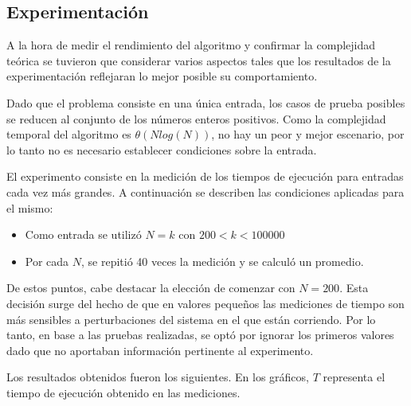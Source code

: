     \subsection{Experimentación}

	A la hora de medir el rendimiento del algoritmo y confirmar la complejidad
	teórica se tuvieron que considerar varios aspectos tales que los
	resultados de la experimentación reflejaran lo mejor posible su
	comportamiento.

	Dado que el problema consiste en una única entrada, los casos de prueba
	posibles se reducen al conjunto de los números enteros positivos. Como la
	complejidad temporal del algoritmo es $\theta(Nlog(N))$, no hay un peor
	y mejor escenario, por lo tanto no es necesario establecer condiciones sobre
	la entrada.

	El experimento consiste en la medición de los tiempos de ejecución para
	entradas cada vez más grandes. A continuación se describen las condiciones aplicadas
	para el mismo:

	\begin{itemize}
		\item{Como entrada se utilizó $N = k$ con $200 < k < 100000$}
		\item{Por cada $N$, se repitió 40 veces la medición y se calculó un
			promedio.}
	\end{itemize}

	De estos puntos, cabe destacar la elección de comenzar con $N = 200$. Esta
	decisión surge del hecho de que en valores pequeños las mediciones de tiempo
	son más sensibles a perturbaciones del sistema en el que están corriendo.
	Por lo tanto, en base a las pruebas realizadas, se optó por ignorar los
	primeros valores dado que no aportaban información pertinente al experimento.

	Los resultados obtenidos fueron los siguientes. En los gráficos, $T$ representa el
    tiempo de ejecución obtenido en las mediciones.

	\newcommand\constante{3}
	\begin{figure}[H]
		\centering
		\caption{}
		\label{fig:exp1:tiempo_base}
	\end{figure}

